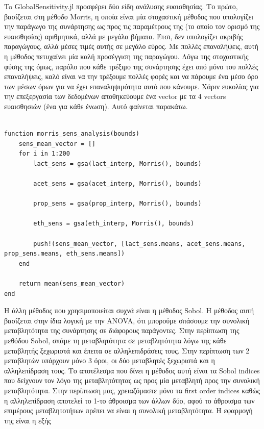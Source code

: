 \documentclass[11pt]{article}
\begin{document}
To GlobalSensitivity.jl προσφέρει δύο είδη ανάλυσης ευαισθησίας. Το πρώτο, βασίζεται στη μέθοδο Morris, η οποία είναι μία στοχαστική μέθοδος που υπολογίζει την παράγωγο της συνάρτησης ως προς τις παραμέτρους της (το οποίο τον ορισμό της ευαισθησίας) αριθμητικά, αλλά με μεγάλα βήματα. Έτσι, δεν υπολογίζει ακριβής παραγώγους, αλλά μέσες τιμές αυτής σε μεγάλο εύρος. Με πολλές επαναλήψεις, αυτή η μέθοδος πετυχαίνει μία καλή προσέγγιση της παραγώγου. Λόγω της στοχαστικής φύσης της όμως, παρόλο που κάθε τρέξιμο της συνάρτησης έχει από μόνο του πολλές επαναλήψεις, καλό είναι να την τρέξουμε πολλές φορές και να πάρουμε ένα μέσο όρο των μέσων όρων για να έχει επαναληψιμότητα αυτό που κάνουμε. Χάριν ευκολίας για την επεξεργασία των δεδομένων αποθηκεύουμε ένα vector με τα 4 vectors ευαισθησιών (ένα για κάθε ένωση). Αυτό φαίνεται παρακάτω.

\begin{verbatim}

function morris_sens_analysis(bounds)
    sens_mean_vector = []
    for i in 1:200
        lact_sens = gsa(lact_interp, Morris(), bounds)

        acet_sens = gsa(acet_interp, Morris(), bounds)

        prop_sens = gsa(prop_interp, Morris(), bounds)

        eth_sens = gsa(eth_interp, Morris(), bounds)

        push!(sens_mean_vector, [lact_sens.means, acet_sens.means, prop_sens.means, eth_sens.means])
    end

    return mean(sens_mean_vector)
end

\end{verbatim}

Η άλλη μέθοδος που χρησιμοποιείται συχνά είναι η μέθοδος Sobol. Η μέθοδος αυτή βασίζεται στην ίδια λογική με την ANOVA, ότι μπορούμε σπάσουμε την συνολική μεταβλητότητα της συνάρτησης σε διάφορους παράγοντες. Στην περίπτωση της μεθόδου Sobol, σπάμε τη μεταβλητότητα σε μεταβλητότητα λόγω της κάθε μεταβλητής ξεχωριστά και έπειτα σε αλληλεπιδράσεις τους. Στην περίπτωση των 2 μεταβλητών υπάρχουν μόνο 3 όροι, οι δύο μεταβλητές ξεχωριστά και η αλληλεπίδραση τους. Το αποτέλεσμα που δίνει η μέθοδος αυτή είναι τα Sobol indices που δείχνουν τον λόγο της μεταβλητότητας ως προς μία μεταβλητή προς την συνολική μεταβλητότητα. Στην περίπτωση μας, χρειαζόμαστε μόνο τα first order indices καθώς η αλληλεπίδραση αποτελεί το 1-το άθροισμα των άλλων δύο, αφού το άθροισμα των επιμέρους μεταβλητοτήτων πρέπει να είναι η συνολική μεταβλητότητα. Η εφαρμογή της είναι η εξής
\end{document}
